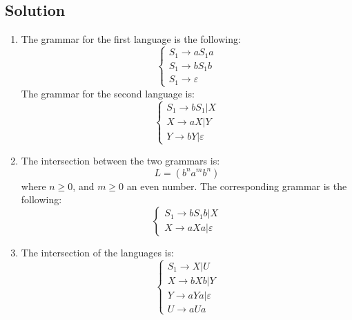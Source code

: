 \documentclass[12pt, a4paper]{report}
\newtheorem[style=M,bodystyle=\normalfont]{theorem}{Theorem}
\newtheorem[style=M,bodystyle=\normalfont]{corollary}{Corollary}
\newtheorem[style=M,bodystyle=\normalfont]{lemma}{Lemma}
\newtheorem[style=M,bodystyle=\normalfont]{definition}{Definition}
\begin{document}
    \subsection*{Solution}
    \begin{enumerate}
        \item The grammar for the first language is the following: 
            \[\begin{cases}
                S_1 \rightarrow aS_1a           \\
                S_1 \rightarrow bS_1b           \\
                S_1 \rightarrow \varepsilon
            \end{cases}\]
            The grammar for the second language is: 
            \[\begin{cases}
                S_1 \rightarrow bS_1|X          \\
                X \rightarrow aX|Y              \\
                Y \rightarrow bY|\varepsilon
            \end{cases}\]
        \item The intersection between the two grammars is: 
            \[L=(b^na^mb^n)\]
            where $n \geq 0$, and $m \geq 0$ an even number. The corresponding grammar is the following: 
            \[\begin{cases}
                S_1 \rightarrow bS_1b | X \\
                X \rightarrow aXa | \varepsilon
            \end{cases}\]
        \item The intersection of the languages is: 
            \[\begin{cases}
                S_1 \rightarrow X | U               \\
                X \rightarrow bXb | Y               \\
                Y \rightarrow aYa | \varepsilon     \\
                U \rightarrow aUa   
            \end{cases}\]
    \end{enumerate}

    \newpage
\end{document}
